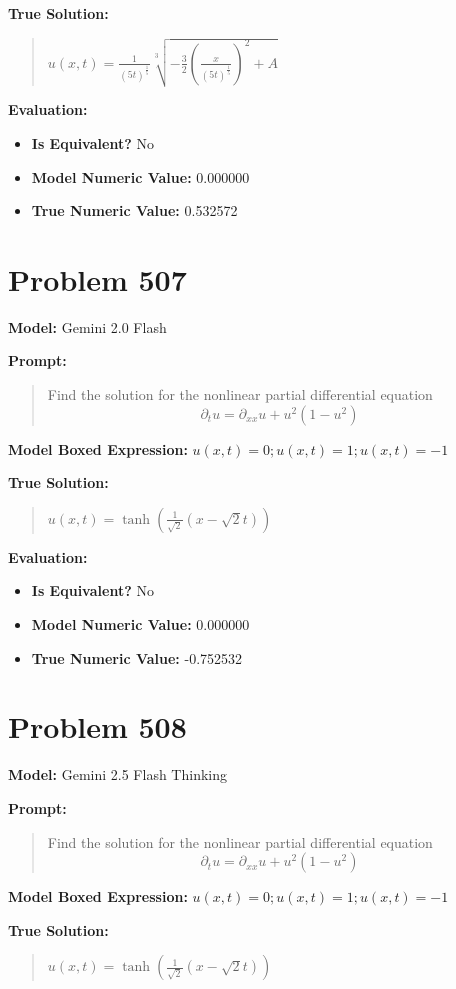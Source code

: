 \documentclass{article}
\begin{document}
\textbf{True Solution:}
\begin{quote}
$u(x,t) = \frac{1}{(5t)^{\frac{1}{5}}} \sqrt[3]{-\frac{3}{2}\left(\frac{x}{(5t)^{\frac{1}{5}}}\right)^2 + A}$
\end{quote}

\textbf{Evaluation:}
\begin{itemize}
\item \textbf{Is Equivalent?} No
\item \textbf{Model Numeric Value:} 0.000000
\item \textbf{True Numeric Value:} 0.532572
\end{itemize}
\vspace{1cm}
\section*{Problem 507}
\textbf{Model:} Gemini 2.0 Flash

\textbf{Prompt:}
\begin{quote}
Find the solution for the nonlinear partial differential equation $$\partial_t u = \partial_{xx}u + u^2 (1 - u^2)$$
\end{quote}
\textbf{Model Boxed Expression:} $u(x,t) = 0; u(x,t) = 1; u(x,t) = -1$

\textbf{True Solution:}
\begin{quote}
$u(x,t)=\tanh( \frac{1}{\sqrt{2}}(x - \sqrt{2}t))$
\end{quote}

\textbf{Evaluation:}
\begin{itemize}
\item \textbf{Is Equivalent?} No
\item \textbf{Model Numeric Value:} 0.000000
\item \textbf{True Numeric Value:} -0.752532
\end{itemize}
\vspace{1cm}
\section*{Problem 508}
\textbf{Model:} Gemini 2.5 Flash Thinking

\textbf{Prompt:}
\begin{quote}
Find the solution for the nonlinear partial differential equation $$\partial_t u = \partial_{xx}u + u^2 (1 - u^2)$$
\end{quote}
\textbf{Model Boxed Expression:} $u(x,t)=0; u(x,t)=1; u(x,t)=-1$

\textbf{True Solution:}
\begin{quote}
$u(x,t)=\tanh( \frac{1}{\sqrt{2}}(x - \sqrt{2}t))$
\end{quote}
\end{document}

